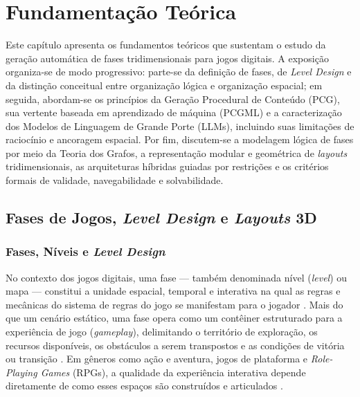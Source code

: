\section{Fundamentação Teórica}
\label{sec:fundamentacao}

Este capítulo apresenta os fundamentos teóricos que sustentam o estudo da geração automática de fases tridimensionais para jogos digitais. A exposição organiza-se de modo progressivo: parte-se da definição de fases, de \textit{Level Design} e da distinção conceitual entre organização lógica e organização espacial; em seguida, abordam-se os princípios da Geração Procedural de Conteúdo (PCG), sua vertente baseada em aprendizado de máquina (PCGML) e a caracterização dos Modelos de Linguagem de Grande Porte (LLMs), incluindo suas limitações de raciocínio e ancoragem espacial. Por fim, discutem-se a modelagem lógica de fases por meio da Teoria dos Grafos, a representação modular e geométrica de \textit{layouts} tridimensionais, as arquiteturas híbridas guiadas por restrições e os critérios formais de validade, navegabilidade e solvabilidade.

\subsection{Fases de Jogos, \textit{Level Design} e \textit{Layouts} 3D}
\label{sec:level_design}

\subsubsection{Fases, Níveis e \textit{Level Design}}
\label{sec:fases_niveis}

No contexto dos jogos digitais, uma fase --- também denominada nível (\textit{level}) ou mapa --- constitui a unidade espacial, temporal e interativa na qual as regras e mecânicas do sistema de regras do jogo se manifestam para o jogador \cite{tanagra, pcgbook}. Mais do que um cenário estático, uma fase opera como um contêiner estruturado para a experiência de jogo (\textit{gameplay}), delimitando o território de exploração, os recursos disponíveis, os obstáculos a serem transpostos e as condições de vitória ou transição \cite{tanagra, linden2014dungeons}. Em gêneros como ação e aventura, jogos de plataforma e \textit{Role-Playing Games} (RPGs), a qualidade da experiência interativa depende diretamente de como esses espaços são construídos e articulados \cite{dormans2010, linden2014dungeons}.


